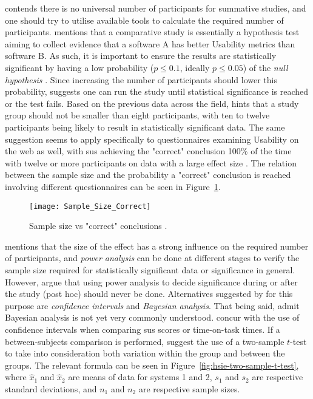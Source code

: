 \textcite{Lewis_2014} contends there is no universal number of participants for summative studies, and one should try to utilise available tools to calculate the required number of participants.
\textcite{Macefield_2009} mentions that a comparative study is essentially a hypothesis test aiming to collect evidence that a software A has better Usability metrics than software B.
As such, it is important to ensure the results are statistically significant by having a low probability ($p \leq 0.1 $, ideally $p \leq 0.05 $) of the \textit{null hypothesis} \parencite{Macefield_2009}.
Since increasing the number of participants should lower this probability, \textcite{Macefield_2009} suggests one can run the study until statistical significance is reached or the test fails.
Based on the previous data across the field, \textcite{Macefield_2009} hints that a study group should not be smaller than eight participants, with ten to twelve participants being likely to result in statistically significant data.
The same suggestion seems to apply specifically to questionnaires examining Usability on the web as well, with \gls{sus} achieving the "correct" conclusion 100\% of the time with twelve or more participants on data with a large effect size \parencite{tullis_comparison_2004}.
The relation between the sample size and the probability a "correct" conclusion is reached involving different questionnaires can be seen in Figure~\ref{fig:hsie-questionnaire-sample-size}.

\begin{figure}[H]
    \centering
    \texttt{[image: Sample\_Size\_Correct]}
    \caption{Sample size vs "correct" conclusions \parencite{tullis_comparison_2004}.}
    \label{fig:hsie-questionnaire-sample-size}
\end{figure}

\textcite{Macefield_2009} mentions that the size of the effect has a strong influence on the required number of participants, and \textit{power analysis} can be done at different stages to verify the sample size required for statistically significant data or significance in general.
However, \textcite{Dziak_Dierker_Abar_2020} argue that using power analysis to decide significance during or after the study (post hoc) should never be done.
Alternatives suggested by \textcite{Dziak_Dierker_Abar_2020} for this purpose are \textit{confidence intervals} and \textit{Bayesian analysis}.
That being said, \textcite{Dziak_Dierker_Abar_2020} admit Bayesian analysis is not yet very commonly understood.
\textcite{sauro_chapter5_2016} concur with the use of confidence intervals when comparing \gls{sus} scores or time-on-task times.
If a between-subjects comparison is performed, \textcite{sauro_chapter5_2016} suggest the use of a two-sample $t$-test to take into consideration both variation within the group and between the groups.
The relevant formula can be seen in Figure~\ref{fig:hsie-two-sample-t-test}, where $\hat{x}_1$ and $\hat{x}_2$ are means of data for systems 1 and 2, $s_1$ and $s_2$ are respective standard deviations, and $n_1$ and $n_2$ are respective sample sizes.

